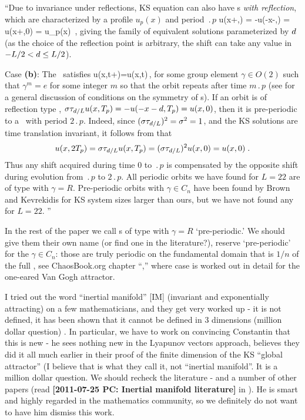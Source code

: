 \begin{description}
``Due to invariance under reflections, KS equation can also have
\rpo s {\em with reflection}, which are
characterized by a profile $u_p(x)$ and
period $\period{p}$
\beq
  \Refl u(x+\shift,) =
  -u(-x-\shift,) = u(x+\shift,0) = u_p(x)
  \,,
\label{KSpos}
\eeq
giving the family of equivalent solutions
parameterized by $d$
(as the choice of the reflection point is arbitrary,
the shift can take any value in $-L/2 < d \leq L/2$).

Case {\bf (b)}: The \po\ satisfies
\beq
	 u(x,t+)=\gamma u(x,t)\,,
	\label{eq:POspattemp}
\eeq
for some group element $\gamma\in O(2)$ such that $\gamma^m=e$ for some
integer $m$ so that the orbit repeats after time $m \period{p}$ (see
 for a general discussion of conditions on the
symmetry of \po s). If an orbit is of reflection type ,
$\sigma\tau_{d/L} u(x,{T_{p}}) = -u(-x-d,{T_{p}}) =
u(x,0)$, then it is pre-periodic to a \po\ with period $2\period{p}$.
Indeed, since $(\sigma\tau_{d/L})^2 = \sigma^2 = 1$, and the KS
solutions are time translation invariant, it follows from 
that
\[
  u(x,2{T_{p}}) = \sigma\tau_{d/L} u(x,{T_{p}}) =
  (\sigma\tau_{d/L})^2 u(x,0) = u(x,0)\;.
\]
Thus any shift acquired during time $0$ to $\period{p}$ is compensated by
the opposite shift during evolution from $\period{p}$ to $2 \period{p}$.
All periodic orbits we have found for $L=22$ are of type
 with $\gamma=R$. Pre-periodic orbits with
$\gamma\in C_n$ have been found by Brown and Kevrekidis for
KS system sizes larger than ours, but we have not found any for $L=22$.
''

In the rest of the paper we call \po s of type  with
$\gamma=R$ `pre-periodic.' We should give them their own name (or find
one in the literature?), reserve `pre-periodic' for the $\gamma\in C_n$:
those are truly periodic on the fundamental domain that is $1/n$ of the
full \statesp, see ChaosBook.org chapter
``,''
where  case is worked out in detail for the one-eared Van Gogh
attractor.

\item[2011-12-06, 2012-02-14 PC]
I tried out the word ``inertial manifold'' [IM] (invariant and exponentially
attracting) on a few mathematicians, and they get very worked up - it is
not defined, it has been shown that it cannot be defined in 3 dimensions
(million dollar question) \etc. In particular, we have to work on
convincing Constantin that this is new - he sees nothing new in the
Lyapunov vectors approach, believes they did it all much earlier in their
proof of the finite dimension of the KS ``global attractor'' (I believe
that is what they call it, not ``inertial manifold''. It is a million
dollar question. We should recheck the literature -
 and a number of other
papers (read {\bf [2011-07-25 PC: Inertial manifold literature]} in
). He is smart and highly regarded in the
mathematics community, so we definitely do not want to have him dismiss
this work.


\end{description}
